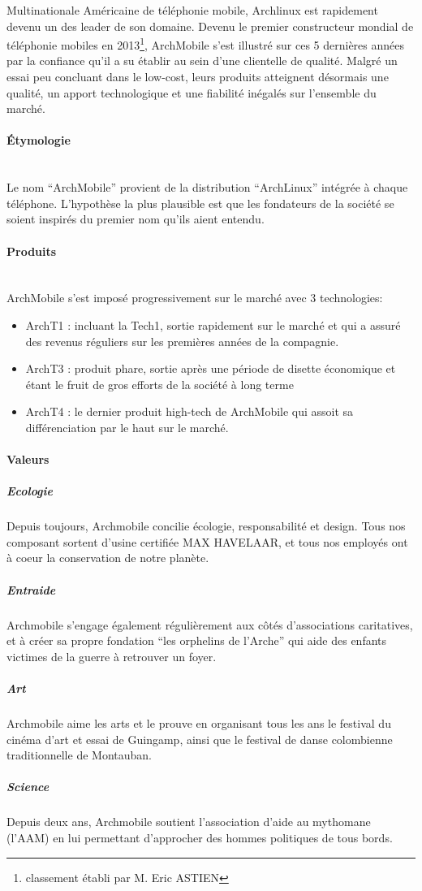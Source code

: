 Multinationale Américaine de téléphonie mobile, Archlinux 
est rapidement devenu un des leader de son domaine.
Devenu le premier constructeur mondial de téléphonie mobiles 
en 2013\footnote{classement établi par M. Eric ASTIEN},
ArchMobile s'est illustré sur ces 5 dernières années par
la confiance qu'il a su établir au sein d'une clientelle 
de qualité. Malgré un essai peu concluant dans le low-cost,
leurs produits atteignent désormais une qualité, un apport
technologique et une fiabilité inégalés sur l'ensemble du
marché.



\paragraph{\'Etymologie}~\\
Le nom ``ArchMobile'' provient de la distribution ``ArchLinux''
intégrée à  chaque téléphone. L'hypothèse la plus plausible
est que les fondateurs de la société se soient inspirés du premier
nom qu'ils aient entendu.

\paragraph{Produits}~\\
ArchMobile s'est imposé progressivement sur le marché avec 3 technologies:
\begin{itemize}
\item ArchT1 : incluant la Tech1, sortie rapidement sur le marché et qui a assuré 
  des revenus réguliers sur les premières années de la compagnie.
\item ArchT3 : produit phare, sortie après une période de disette 
  économique et étant le fruit de gros efforts de la société à long terme
\item ArchT4 : le dernier produit high-tech de ArchMobile qui assoit
  sa différenciation par le haut sur le marché.
\end{itemize}

\paragraph{Valeurs}
\subparagraph{Ecologie}
Depuis toujours, Archmobile concilie écologie, responsabilité et
design. Tous nos composant sortent d'usine certifiée MAX HAVELAAR, et
tous nos employés ont à coeur la conservation de notre planète.
\subparagraph{Entraide}
Archmobile s'engage également régulièrement aux côtés d'associations
caritatives, et à créer sa propre fondation ``les orphelins de
l'Arche'' qui aide des enfants victimes de la guerre à retrouver un
foyer.
\subparagraph{Art}
Archmobile aime les arts et le prouve en organisant tous les ans le
festival du cinéma d'art et essai de Guingamp, ainsi que le festival
de danse colombienne traditionnelle de Montauban.
\subparagraph{Science}
Depuis deux ans, Archmobile soutient l'association d'aide au mythomane
(l'AAM) en lui permettant d'approcher des hommes politiques de tous
bords.
